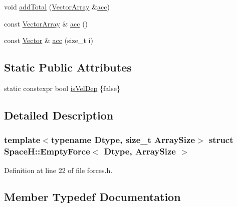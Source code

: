 \begin{DoxyCompactItemize}
void \mbox{\hyperlink{struct_space_h_1_1_empty_force_a6aed735e5443a08ad6e70ae6bcd74bf8}{add\+Total}} (\mbox{\hyperlink{struct_space_h_1_1_empty_force_a06ad868879a6fa5def9c7f9fd75fffde}{Vector\+Array}} \&\mbox{\hyperlink{struct_space_h_1_1_empty_force_a1547f680e4dbf0cb9fc7e945872928e2}{acc}})
\item 
const \mbox{\hyperlink{struct_space_h_1_1_empty_force_a06ad868879a6fa5def9c7f9fd75fffde}{Vector\+Array}} \& \mbox{\hyperlink{struct_space_h_1_1_empty_force_a1547f680e4dbf0cb9fc7e945872928e2}{acc}} ()
\item 
const \mbox{\hyperlink{struct_space_h_1_1_empty_force_abfd8a2b724383a3a2dde191d95ca0661}{Vector}} \& \mbox{\hyperlink{struct_space_h_1_1_empty_force_aef51b27e9c50c23783619e82dca0b1e6}{acc}} (size\+\_\+t i)
\end{DoxyCompactItemize}
\subsection*{Static Public Attributes}
\begin{DoxyCompactItemize}
\item 
static constexpr bool \mbox{\hyperlink{struct_space_h_1_1_empty_force_a9c02c91b7ec657b88c89ef02307ca4b5}{is\+Vel\+Dep}} \{false\}
\end{DoxyCompactItemize}


\subsection{Detailed Description}
\subsubsection*{template$<$typename Dtype, size\+\_\+t Array\+Size$>$\newline
struct Space\+H\+::\+Empty\+Force$<$ Dtype, Array\+Size $>$}



Definition at line 22 of file forces.\+h.



\subsection{Member Typedef Documentation}
\mbox{\label{struct_space_h_1_1_empty_force_a25e0bd933dd3715e315c1abdb6843c36}} 
